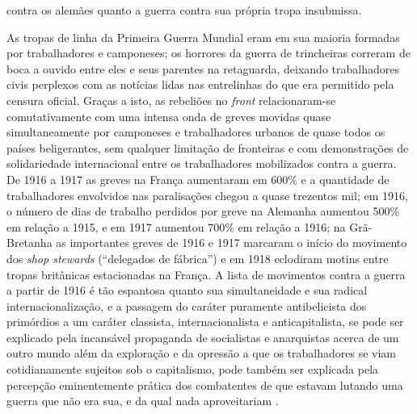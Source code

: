 contra os alemães quanto a guerra contra sua própria tropa insubmissa. 

As tropas de linha da Primeira Guerra Mundial eram em sua maioria formadas por trabalhadores e camponeses; os horrores da guerra de trincheiras correram de boca a ouvido entre eles e seus parentes na retaguarda, deixando trabalhadores civis perplexos com as notícias lidas nas entrelinhas do que era permitido pela censura oficial. Graças a isto, as rebeliões no \textit{front} relacionaram-se comutativamente com uma intensa onda de greves movidas quase simultaneamente por camponeses e trabalhadores urbanos de quase todos os países beligerantes, sem qualquer limitação de fronteiras e com demonstrações de solidariedade internacional entre os trabalhadores mobilizados contra a guerra. De 1916 a 1917 as greves na França aumentaram em 600\% e a quantidade de trabalhadores envolvidos nas paralisações chegou a quase trezentos mil; em 1916, o número de dias de trabalho perdidos por greve na Alemanha aumentou 500\% em relação a 1915, e em 1917 aumentou 700\% em relação a 1916; na Grã-Bretanha as importantes greves de 1916 e 1917 marcaram o início do movimento dos \textit{shop stewards} (``delegados de fábrica'') e em 1918 eclodiram motins entre tropas britânicas estacionadas na França. A lista de movimentos contra a guerra a partir de 1916 é tão espantosa quanto sua simultaneidade e sua radical internacionalização, e a passagem do caráter puramente antibelicista dos primórdios a um caráter classista, internacionalista e anticapitalista, se pode ser explicado pela incansável propaganda de socialistas e anarquistas acerca de um outro mundo além da exploração e da opressão a que os trabalhadores se viam cotidianamente sujeitos sob o capitalismo, pode também ser explicada pela percepção eminentemente prática dos combatentes de que estavam lutando uma guerra que não era sua, e da qual nada aproveitariam \cite[p.~232-251]{bernardo_fascismo_2015}.

